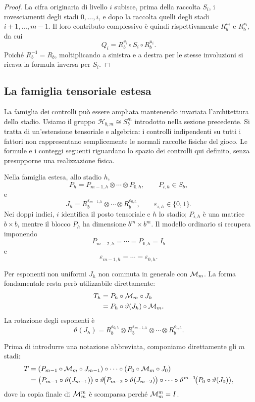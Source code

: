 	\begin{proof}
		La cifra originaria di livello \(i\) subisce, prima della raccolta
		\(S_i\), i rovesciamenti degli stadi \(0,\dots,i\), e dopo la raccolta
		quelli degli stadi \(i+1,\dots,m-1\). Il loro contributo complessivo è
		quindi rispettivamente \(R_b^{u_i}\) e \(R_b^{v_i}\), da cui
		\[
		Q_i
		=
		R_b^{v_i}\circ S_i\circ R_b^{u_i}.
		\]
		Poiché \(R_b^{-1}=R_b\), moltiplicando a sinistra e a destra per le
		stesse involuzioni si ricava la formula inversa per \(S_i\).
	\end{proof}

	\subsection{La famiglia tensoriale estesa}

	La famiglia dei controlli può essere ampliata mantenendo invariata
	l'architettura dello stadio. Usiamo il gruppo
	\(\mathcal H_{b,m}\cong S_b^m\) introdotto nella sezione precedente.
	Si tratta di un'estensione tensoriale e algebrica: i controlli indipendenti
	su tutti i fattori non rappresentano semplicemente le normali raccolte
	fisiche del gioco. Le formule e i conteggi seguenti riguardano lo spazio
	dei controlli qui definito, senza presupporne una realizzazione fisica.

	Nella famiglia estesa, allo stadio \(h\),
	\[
	P_h
	=
	P_{m-1,h}\otimes\cdots\otimes P_{0,h},
	\qquad
	P_{i,h}\in S_b,
	\]
	e
	\[
	J_h
	=
	R_b^{\varepsilon_{m-1,h}}
	\otimes\cdots\otimes
	R_b^{\varepsilon_{0,h}},
	\qquad
	\varepsilon_{i,h}\in\{0,1\}.
	\]
	Nei doppi indici, \(i\) identifica il posto tensoriale e \(h\) lo stadio;
	\(P_{i,h}\) è una matrice \(b\times b\), mentre il blocco \(P_h\) ha
	dimensione \(b^m\times b^m\).
	Il modello ordinario si recupera imponendo
	\[
	P_{m-2,h}=\cdots=P_{0,h}=I_b
	\]
	e
	\[
	\varepsilon_{m-1,h}
	=
	\cdots
	=
	\varepsilon_{0,h}.
	\]

	Per esponenti non uniformi \(J_h\) non commuta in generale con
	\(\mathcal M_m\). La forma fondamentale resta però utilizzabile direttamente:
	\[
	\begin{aligned}
	T_h
	&=
	P_h\circ\mathcal M_m\circ J_h\\
	&=
	P_h\circ\vartheta(J_h)\circ\mathcal M_m.
	\end{aligned}
	\]
	La rotazione degli esponenti è
	\[
	\vartheta(J_h)
	=
	R_b^{\varepsilon_{0,h}}
	\otimes
	R_b^{\varepsilon_{m-1,h}}
	\otimes\cdots\otimes
	R_b^{\varepsilon_{1,h}}.
	\]

	Prima di introdurre una notazione abbreviata, componiamo direttamente gli
	\(m\) stadi:
	\[
	\begin{aligned}
	T
	&=
	(P_{m-1}\circ\mathcal M_m\circ J_{m-1})
	\circ\cdots\circ
	(P_0\circ\mathcal M_m\circ J_0)\\
	&=
	\bigl(P_{m-1}\circ\vartheta(J_{m-1})\bigr)
	\circ
	\vartheta\!\bigl(P_{m-2}\circ\vartheta(J_{m-2})\bigr)
	\circ \cdots \circ\vartheta^{m-1}\!\bigl(P_0\circ\vartheta(J_0)\bigr),
	\end{aligned}
	\]
	dove la copia finale di \(\mathcal M_m^m\) è scomparsa perché
	\(\mathcal M_m^m=I\).

